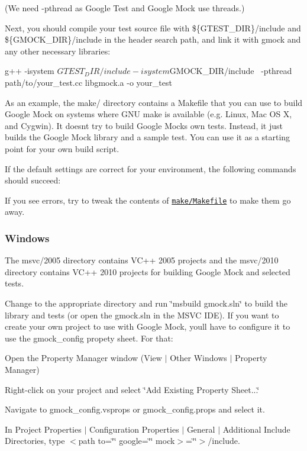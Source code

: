 (We need -\/pthread as Google Test and Google Mock use threads.)

Next, you should compile your test source file with \$\{G\+T\+E\+S\+T\+\_\+\+D\+IR\}/include and \$\{G\+M\+O\+C\+K\+\_\+\+D\+IR\}/include in the header search path, and link it with gmock and any other necessary libraries\+: \begin{DoxyVerb}g++ -isystem ${GTEST_DIR}/include -isystem ${GMOCK_DIR}/include \
    -pthread path/to/your_test.cc libgmock.a -o your_test
\end{DoxyVerb}


As an example, the make/ directory contains a Makefile that you can use to build Google Mock on systems where G\+NU make is available (e.\+g. Linux, Mac OS X, and Cygwin). It doesn\textquotesingle{}t try to build Google Mock\textquotesingle{}s own tests. Instead, it just builds the Google Mock library and a sample test. You can use it as a starting point for your own build script.

If the default settings are correct for your environment, the following commands should succeed\+: \begin{DoxyVerb}cd ${GMOCK_DIR}/make
make
./gmock_test
\end{DoxyVerb}


If you see errors, try to tweak the contents of \href{make/Makefile}{\tt make/\+Makefile} to make them go away.

\subsubsection*{Windows}

The msvc/2005 directory contains V\+C++ 2005 projects and the msvc/2010 directory contains V\+C++ 2010 projects for building Google Mock and selected tests.

Change to the appropriate directory and run \char`\"{}msbuild gmock.\+sln\char`\"{} to build the library and tests (or open the gmock.\+sln in the M\+S\+VC I\+DE). If you want to create your own project to use with Google Mock, you\textquotesingle{}ll have to configure it to use the {\ttfamily gmock\+\_\+config} propety sheet. For that\+:


\begin{DoxyItemize}
\item Open the Property Manager window (View $\vert$ Other Windows $\vert$ Property Manager)
\item Right-\/click on your project and select \char`\"{}\+Add Existing Property Sheet...\char`\"{}
\item Navigate to {\ttfamily gmock\+\_\+config.\+vsprops} or {\ttfamily gmock\+\_\+config.\+props} and select it.
\item In Project Properties $\vert$ Configuration Properties $\vert$ General $\vert$ Additional Include Directories, type $<$path to=\char`\"{}\char`\"{} google=\char`\"{}\char`\"{} mock$>$=\char`\"{}\char`\"{}$>$/include.
\end{DoxyItemize}

